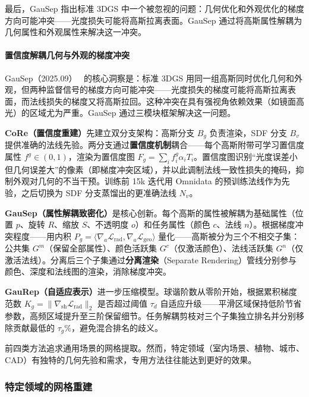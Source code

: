 最后，GauSep 指出标准 3DGS 中一个被忽视的问题：几何优化和外观优化的梯度方向可能冲突——光度损失可能将高斯拉离表面。GauSep 通过将高斯属性解耦为几何属性和外观属性来解决这一冲突。

\paragraph{置信度解耦几何与外观的梯度冲突}

GauSep（2025.09）~\cite{2509_12742} 的核心洞察是：标准 3DGS 用同一组高斯同时优化几何和外观，但两种监督信号的梯度方向可能冲突——光度损失的梯度可能将高斯拉离表面，而法线损失的梯度又将高斯拉回。这种冲突在具有强视角依赖效果（如镜面高光）的区域尤为严重。GauSep 通过三模块框架解决这一问题。

\textbf{CoRe（置信度重建）}先建立双分支架构：高斯分支 $B_g$ 负责渲染，SDF 分支 $B_v$ 提供准确的法线先验。两分支通过\textbf{置信度机制}耦合——每个高斯附带可学习置信度属性 $f^g \in (0,1)$，渲染为置信度图 $F_g = \sum_i f^g_i \alpha_i T_i$。置信度图识别“光度误差小但几何误差大”的像素（即梯度冲突区域），并以此调制法线一致性损失的掩码，抑制外观对几何的不当干预。训练前 15k 迭代用 Omnidata 的预训练法线作为先验，之后切换为 SDF 分支蒸馏出的更准确法线 $N_v$。

\textbf{GauSep（属性解耦致密化）}是核心创新。每个高斯的属性被解耦为基础属性（位置 $p$、旋转 $R$、缩放 $S$、不透明度 $o$）和任务属性（颜色 $c$、法线 $n$）。根据梯度冲突程度——用内积 $P_g = \langle \nabla_a \mathcal{L}_{\text{rad}}, \nabla_a \mathcal{L}_{\text{geo}} \rangle$ 量化——高斯被分为三个不相交子集：公共集 $G^m$（保留全部属性）、颜色活跃集 $G^c$（仅激活颜色）、法线活跃集 $G^n$（仅激活法线）。分离后三个子集通过\textbf{分离渲染}（Separate Rendering）管线分别参与颜色、深度和法线图的渲染，消除梯度冲突。

\textbf{GauRep（自适应表示）}进一步压缩模型。球谐阶数从零阶开始，根据累积梯度范数 $K_g = \|\nabla_{\text{sh}} \mathcal{L}_{\text{rad}}\|_2$ 是否超过阈值 $\tau_d$ 自适应升级——平滑区域保持低阶节省参数，高频区域提升至三阶保留细节。任务解耦剪枝对三个子集独立排名并分别移除贡献最低的 $\tau_g\%$，避免混合排名的歧义。

前四类方法追求通用场景的网格提取。然而，特定领域（室内场景、植物、城市、CAD）有独特的几何先验和需求，专用方法往往能达到更好的效果。

\subsubsection{特定领域的网格重建}
\label{subsec:04_4_5}

